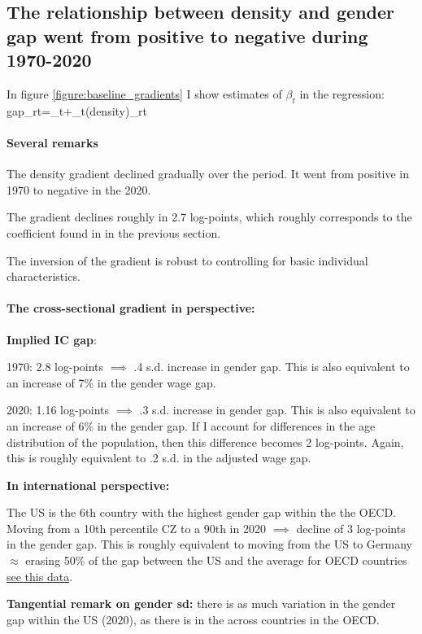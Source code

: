

\subsection{The relationship between density and gender gap went from positive to negative during 1970-2020}

In figure \ref{figure:baseline_gradients} I show estimates of $\beta_t$ in the regression:
\beqns
	gap_{rt}=\alpha_t+\beta_t\ln(density)_{rt}
\eeqns

\paragraph{Several remarks}
\bitem
	\item The density gradient declined gradually over the period. It went from positive in 1970 to negative in the 2020.
	\item The gradient declines roughly in 2.7 log-points, which roughly corresponds to the coefficient found in in the previous section.
	\item The inversion of the gradient is robust to controlling for basic individual characteristics.
\eitem 


\paragraph{The cross-sectional gradient in perspective:}
\bitem 
\item \textbf{Implied IC gap}:
\bitem
	\item 1970: 2.8 log-points $\implies$ .4 s.d. increase in gender gap. This is also equivalent to an increase of 7\% in the gender wage gap. 
	\item 2020: 1.16 log-points $\implies$ .3 s.d. increase in gender gap. This is also equivalent to an increase of 6\% in the gender gap. If I account for differences in the age distribution of the population, then this difference becomes 2 log-points. Again, this is roughly equivalent to .2 s.d. in the adjusted wage gap.
\eitem
	\item \textbf{In international perspective:} 
	\bitem 
	\item The US is the 6th country with the highest gender gap within the the OECD. Moving from a 10th percentile CZ to a 90th in 2020 $\implies$ decline of 3 log-points in the gender gap. This is roughly equivalent to moving from the US to Germany $\approx$ erasing 50\% of the gap between the US and the average for OECD countries \href{https://data.oecd.org/earnwage/gender-wage-gap.htm}{see this data}.
	\item \textbf{Tangential remark on gender sd:} there is as much variation in the gender gap within the US (2020), as there is in the across countries in the OECD.

